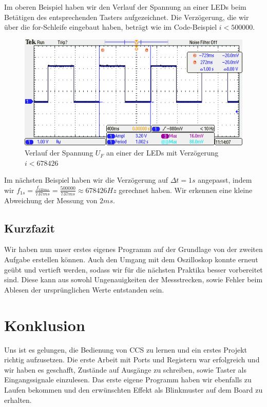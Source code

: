 \documentclass{article}
\begin{document}
Im oberen Beispiel haben wir den Verlauf der Spannung an einer LEDs beim Betätigen des entsprechenden Tasters aufgezeichnet. Die Verzögerung, die wir über die for-Schleife eingebaut haben, beträgt wie im Code-Beispiel $i < 500000$.

\begin{figure}[h]
  \includegraphics[width=\textwidth]{TEK00009.PNG}
  \caption{Verlauf der Spannung $U_F$ an einer der LEDs mit Verzögerung $i < 678426$}
\end{figure}

Im nächsten Beispiel haben wir die Verzögerung auf $\Delta t = 1s$ angepasst, indem wir $f_{1s} = \frac{f_{737ms}}{737ms} = \frac{500000}{737ms} \approx 678426 Hz$ gerechnet haben. Wir erkennen eine kleine Abweichung der Messung von $2ms$. 
\subsection{Kurzfazit}
Wir haben nun unser erstes eigenes Programm auf der Grundlage von der zweiten Aufgabe erstellen können. Auch den Umgang mit dem Oszilloskop konnte erneut geübt und vertieft werden, sodass wir für die nächsten Praktika besser vorbereitet sind. Diese kann aus sowohl Ungenauigkeiten der Messstrecken, sowie Fehler beim Ablesen der ursprünglichen Werte entstanden sein. 

\section{Konklusion}

Uns ist es gelungen, die Bedienung von CCS zu lernen und ein erstes Projekt richtig aufzusetzen. Die erste Arbeit mit Ports und Registern war erfolgreich und wir haben es geschafft, Zustände auf Ausgänge zu schreiben, sowie Taster als Eingangssignale einzulesen. Das erste eigene Programm haben wir ebenfalls zu Laufen bekommen und den erwünschten Effekt als Blinkmuster auf dem Board zu erhalten.
\end{document}
